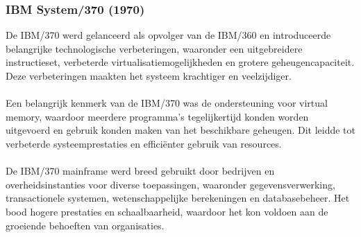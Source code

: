 \subsubsection{IBM System/370 (1970)}
\label{sec:IBM System/370}
De IBM/370 werd gelanceerd als opvolger van de IBM/360 en introduceerde belangrijke technologische verbeteringen, waaronder een uitgebreidere instructieset, verbeterde virtualisatiemogelijkheden en grotere geheugencapaciteit. Deze verbeteringen maakten het systeem krachtiger en veelzijdiger. \autocite{IBM1970}
\\
\\
Een belangrijk kenmerk van de IBM/370 was de ondersteuning voor virtual memory, waardoor meerdere programma's tegelijkertijd konden worden uitgevoerd en gebruik konden maken van het beschikbare geheugen. Dit leidde tot verbeterde systeemprestaties en efficiënter gebruik van resources. \autocite{IBM1970}
\\
\\
De IBM/370 mainframe werd breed gebruikt door bedrijven en overheidsinstanties voor diverse toepassingen, waaronder gegevensverwerking, transactionele systemen, wetenschappelijke berekeningen en databasebeheer. Het bood hogere prestaties en schaalbaarheid, waardoor het kon voldoen aan de groeiende behoeften van organisaties. \autocite{IBM1970}
\\
\\
